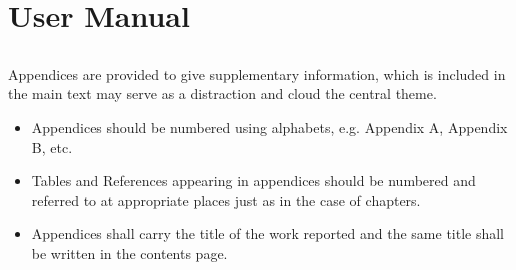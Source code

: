 \chapter{User Manual} \label{ap:Appendix1}

\section*{}
Appendices are provided to give supplementary information, which is included in the main text may serve as a distraction and cloud the central theme.

\begin{itemize}
	\item Appendices should be numbered using alphabets, e.g. Appendix A, Appendix B, etc.
	\item Tables and References appearing in appendices should be numbered and referred to at appropriate places just as in the case of chapters.
	\item Appendices shall carry the title of the work reported and the same title
shall be written in the contents page.
\end{itemize}
